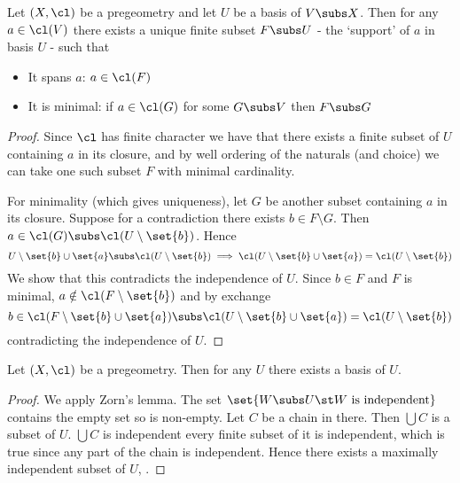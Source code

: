 \begin{lem}
    Let $(X,\cl)$ be a pregeometry and let $U$ be a basis of $V \subs X$.
    Then for any $a \in \cl(V)$ there exists a unique finite subset $F \subs U$
    - the `support' of $a$ in basis $U$ - such that 
    \begin{itemize}
        \item It spans $a$: $a \in \cl(F)$
        \item It is minimal: 
        if $a \in \cl(G)$ for some $G \subs V$ then $F \subs G$
    \end{itemize}
\end{lem}
\begin{proof}
    Since $\cl$ has finite character we have that there exists a finite subset 
    of $U$ containing $a$ in its closure, 
    and by well ordering of the naturals (and choice) we can take one such 
    subset $F$ with minimal cardinality.

    For minimality (which gives uniqueness),
    let $G$ be another subset containing $a$ in its closure.
    Suppose for a contradiction there exists $b \in F \setminus G$.
    Then $a \in \cl(G) \subs \cl(U \setminus \set{b})$.
    Hence 
    \[
        U \setminus \set{b} \cup \set{a} \subs \cl(U \setminus \set{b})
        \implies 
        \cl(U \setminus \set{b} \cup \set{a}) = \cl(U \setminus \set{b})
    \]
    We show that this contradicts the independence of $U$.
    Since $b \in F$ and $F$ is minimal,
    $a \notin \cl(F \setminus \set{b})$ and by exchange 
    \[
        b \in \cl(F \setminus \set{b} \cup \set{a}) 
        \subs \cl(U \setminus \set{b} \cup \set{a}) 
        = \cl(U \setminus \set{b})
    \]
    contradicting the independence of $U$.
\end{proof}

\begin{prop}
    Let $(X,\cl)$ be a pregeometry.
    Then for any $U$ there exists a basis of $U$.
\end{prop}
\begin{proof}
    We apply Zorn's lemma.
    The set $\set{W \subs U \st W \text{ is independent}}$
    contains the empty set so is non-empty.
    Let $C$ be a chain in there.
    Then $\bigcup C$ is a subset of $U$.
    $\bigcup C$ is independent 
    every finite subset of it is independent, 
    which is true since any part of the chain is independent.
    Hence there exists a maximally independent subset of $U$,
    .
\end{proof}

